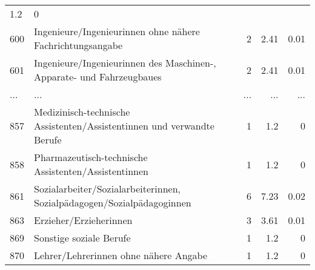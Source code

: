 \begin{longtable}{lXrrr}
          \num[round-mode=places,round-precision=2]{1.2} &
          \num[round-mode=places,round-precision=2]{0} \\
        600 & \multicolumn{1}{X}{Ingenieure/Ingenieurinnen ohne nähere Fachrichtungsangabe} & %
          \num{2} &
          \num[round-mode=places,round-precision=2]{2.41} &
          \num[round-mode=places,round-precision=2]{0.01} \\
        601 & \multicolumn{1}{X}{Ingenieure/Ingenieurinnen des Maschinen-, Apparate- und Fahrzeugbaues} & %
          \num{2} &
          \num[round-mode=places,round-precision=2]{2.41} &
          \num[round-mode=places,round-precision=2]{0.01} \\
       ... & ... & ... & ... & ... \\
        857 & \multicolumn{1}{X}{Medizinisch-technische Assistenten/Assistentinnen und verwandte Berufe} & %
          \num{1} &
          \num[round-mode=places,round-precision=2]{1.2} &
          \num[round-mode=places,round-precision=2]{0} \\

        858 & \multicolumn{1}{X}{Pharmazeutisch-technische Assistenten/Assistentinnen} & %
          \num{1} &
          \num[round-mode=places,round-precision=2]{1.2} &
          \num[round-mode=places,round-precision=2]{0} \\

        861 & \multicolumn{1}{X}{Sozialarbeiter/Sozialarbeiterinnen, Sozialpädagogen/Sozialpädagoginnen} & %
          \num{6} &
          \num[round-mode=places,round-precision=2]{7.23} &
          \num[round-mode=places,round-precision=2]{0.02} \\

        863 & \multicolumn{1}{X}{Erzieher/Erzieherinnen} & %
          \num{3} &
          \num[round-mode=places,round-precision=2]{3.61} &
          \num[round-mode=places,round-precision=2]{0.01} \\

        869 & \multicolumn{1}{X}{Sonstige soziale Berufe} & %
          \num{1} &
          \num[round-mode=places,round-precision=2]{1.2} &
          \num[round-mode=places,round-precision=2]{0} \\

        870 & \multicolumn{1}{X}{Lehrer/Lehrerinnen ohne nähere Angabe} & %
          \num{1} &
          \num[round-mode=places,round-precision=2]{1.2} &
          \num[round-mode=places,round-precision=2]{0} \\


\end{longtable}
